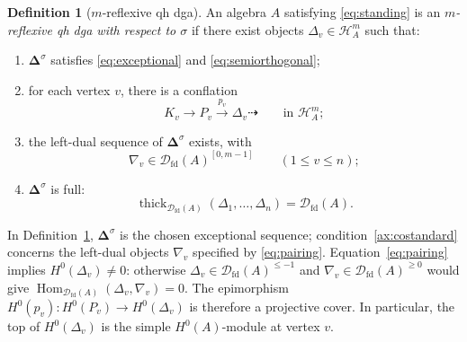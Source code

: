\documentclass[11pt,a4paper]{article}
\newcommand{\defn}[1]{\textsl{\color{darkblue} #1}}
\newcommand{\D}{\mathcal D}
\renewcommand{\H}{\mathcal H}
\newcommand{\std}{\Delta}
\newcommand{\costd}{\nabla}
\DeclareMathOperator{\fd}{fd}
\DeclareMathOperator{\Hom}{Hom}
\DeclareMathOperator{\thick}{thick}
\theoremstyle{plain}
\theoremstyle{definition}
\newtheorem{definition}[theorem]{Definition}
\numberwithin{equation}{section}
\begin{document}
\begin{definition}[$m$-reflexive qh dga]\label{def:reflexive}
An algebra $A$ satisfying \eqref{eq:standing} is an
\defn{$m$-reflexive qh dga with respect to $\sigma$} if there exist
objects $\std_v\in\H_A^m$ such that:
\begin{enumerate}[label=\textup{(R\arabic*)},ref=R\arabic*]
 \item\label{ax:exceptional}
 $\boldsymbol\std^\sigma$ satisfies
 \eqref{eq:exceptional} and \eqref{eq:semiorthogonal};
 \item\label{ax:presentation}
 for each vertex $v$, there is a conflation
 \begin{equation}\label{eq:presentation}
 K_v\longrightarrow P_v\xrightarrow{p_v}\std_v\dashrightarrow
 \qquad\text{in }\H_A^m;
 \end{equation}
 \item\label{ax:costandard}
 the left-dual sequence of $\boldsymbol\std^\sigma$ exists, with
 \begin{equation}\label{eq:costandard-window}
 \costd_v\in\D_{\fd}(A)^{[0,m-1]}
 \qquad(1\leq v\leq n);
 \end{equation}
 \item\label{ax:full}
 $\boldsymbol\std^\sigma$ is full:
 \begin{equation}\label{eq:full}
 \thick_{\D_{\fd}(A)}(\std_1,\ldots,\std_n)=\D_{\fd}(A).
 \end{equation}
\end{enumerate}
\end{definition}

In Definition~\ref{def:reflexive}, $\boldsymbol\std^\sigma$ is the chosen
exceptional sequence; condition~\ref{ax:costandard} concerns the
left-dual objects $\costd_v$ specified by \eqref{eq:pairing}.
Equation~\eqref{eq:pairing} implies $H^0(\std_v)\neq0$:
otherwise $\std_v\in\D_{\fd}(A)^{\leq-1}$ and
$\costd_v\in\D_{\fd}(A)^{\geq0}$ would give
$\Hom_{\D_{\fd}(A)}(\std_v,\costd_v)=0$.
The epimorphism
$H^0(p_v):H^0(P_v)\to H^0(\std_v)$ is therefore a projective cover.
In particular, the top of $H^0(\std_v)$ is the simple $H^0(A)$-module
at vertex $v$.
\end{document}
